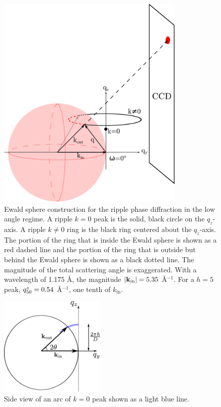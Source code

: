 \begin{figure}[htbp]
  \centering
  \includegraphics[width=0.8\textwidth]{figures/ripple/ripple_sample_qspace}
  \caption{Ewald sphere construction for the ripple phase diffraction in
  the low angle regime. A ripple $k=0$ peak is the solid, black circle
  on the $q_z$-axis.
  A ripple $k\neq 0$ ring is the black ring centered about the $q_z$-axis. 
  The portion of the ring that is 
  inside the Ewald sphere is shown as a red dashed line and the portion of the 
  ring that is outside but behind the Ewald sphere is shown as a black
  dotted line. The magnitude of the total scattering angle is exaggerated. 
  With a wavelength
  of 1.175 \AA, the magnitude $|\mathbf{k}_{\mathrm{in}}|=5.35$ \AA$^{-1}$. For a $h=5$ peak,
  $q_{50}^z=0.54$ \AA$^{-1}$, one tenth of $k_\textrm{in}$.}
  \label{fig:ripple_sample_qspace}
\end{figure}

\begin{figure}[htbp]
  \centering
  \includegraphics[width=0.45\textwidth]{figures/ripple/ewald_main}
  \caption{Side view of an arc of $k=0$ peak shown as a light blue line.}
  \label{fig:ewald_main}
\end{figure}

